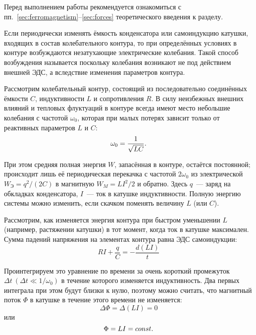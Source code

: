 


Перед выполнением работы рекомендуется ознакомиться с
пп.~\ref{sec:ferromagnetism}--\ref{sec:forces} теоретического
введения к разделу.

Если периодически изменять ёмкость конденсатора или самоиндукцию катушки, входящих в состав колебательного контура, то при определённых условиях в контуре возбуждаются незатухающие электрические колебания. Такой способ возбуждения называется  поскольку колебания возникают не под действием внешней ЭДС, а вследствие изменения параметров контура.

Рассмотрим колебательный контур, состоящий из последовательно соединённых ёмкости $C$, индуктивности $L$ и сопротивления $R$. В силу неизбежных внешних влияний и тепловых флуктуаций в контуре всегда имеют место небольшие колебания с частотой $\omega_0$, которая при малых потерях зависит только от реактивных параметров $L$ и $C$:
\begin{equation}
	\eqmark{4.6.1}
	 \omega_0 = \frac{1}{\sqrt{LC}}.
\end{equation}

При этом средняя полная энергия $W$, запасённая в контуре, остаётся постоянной; происходит лишь её периодическая перекачка с частотой $2\omega_0$ из электрической $W_\text{Э} = q^2 / (2C)$ в магнитную $W_M = LI^2/2$ и обратно. Здесь $q$~--- заряд на обкладках конденсатора, $I$~--- ток в катушке индуктивности. Полную энергию системы можно изменить, если скачком поменять величину $L$ (или $C$).

 Рассмотрим, как изменяется энергия контура при быстром уменьшении $L$ (например, растяжении катушки) в тот момент, когда ток в катушке максимален. Сумма падений напряжения на элементах контура равна ЭДС самоиндукции:
\begin{equation*}
	RI + \frac{q}{C}= - \frac{d(LI)}{t}
\end{equation*}

Проинтегрируем это уравнение по времени за очень короткий промежуток $\Delta t ~(\Delta t \ll 1/\omega_0)$ в течение которого изменяется индуктивность. Два первых интеграла при этом будут близки к нулю, поэтому можно считать, что магнитный поток $\Phi$ в катушке в течение этого времени не изменяется:
\begin{equation*}
	\Delta \Phi=\Delta (LI) = 0
\end{equation*}
 или
\begin{equation}
	\eqmark{4.6.2}
	\Phi=LI =const.
\end{equation}

